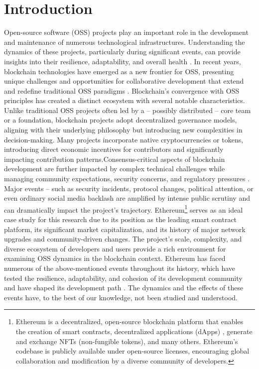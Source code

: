 \section{Introduction}
\label{intro}

Open-source software (OSS) projects play an important role in the development and maintenance of numerous technological infrastructures. Understanding the dynamics of these projects, particularly during significant events, can provide insights into their resilience, adaptability, and overall health \cite{malgonde2023resilience}. 
In recent years, blockchain technologies have emerged as a new frontier for OSS, presenting unique challenges and opportunities for collaborative development that extend and redefine traditional OSS paradigms \cite{Berdik2021}. 
Blockchain's convergence with OSS principles has created a distinct ecosystem with several notable characteristics. Unlike traditional OSS projects often led by a -- possibly distributed -- core team or a foundation\cite{Oreg2008Exploring}, blockchain projects adopt decentralized governance models\cite{Liu2021A}, aligning with their underlying philosophy but introducing new complexities in decision-making. Many projects incorporate native cryptocurrencies or tokens, introducing direct economic incentives for contributors and significantly impacting contribution patterns\cite{Petryk2023Impact}.Consensus-critical aspects of blockchain development are further impacted by complex technical challenges while managing community expectations, security concerns, and regulatory pressures  \cite{Chu2019The,TOUFAILY2021103444}. Major events -- such as security incidents, protocol changes, political attention, or even ordinary social media backlash are amplified by intense public scrutiny and can dramatically impact the project's trajectory\cite{Iqbal2020Asymmetric, ortu2022cryptocurrency}.
Ethereum\footnote{Ethereum is a decentralized, open-source blockchain platform that enables the creation of smart contracts, decentralized applications (dApps) \cite{Aufiero2024,ibba2024mindthedapp}, generate and exchange NFTs (non-fungible tokens), and many others. 
Ethereum's codebase is publicly available under open-source licenses, encouraging global collaboration and modification by a diverse community of developers.} serves as an ideal case study for this research due to its position as the leading smart contract platform, its significant market capitalization, and its history of major network upgrades and community-driven changes. The project's scale, complexity, and diverse ecosystem of developers and users provide a rich environment for examining OSS dynamics in the blockchain context.
Ethereum has faced numerous of the above-mentioned events throughout its history, which have tested the resilience, adaptability, and cohesion of its development community and have shaped its development path \cite{li2023development}. The dynamics and the effects of these events have, to the best of our knowledge, not been studied and understood.

